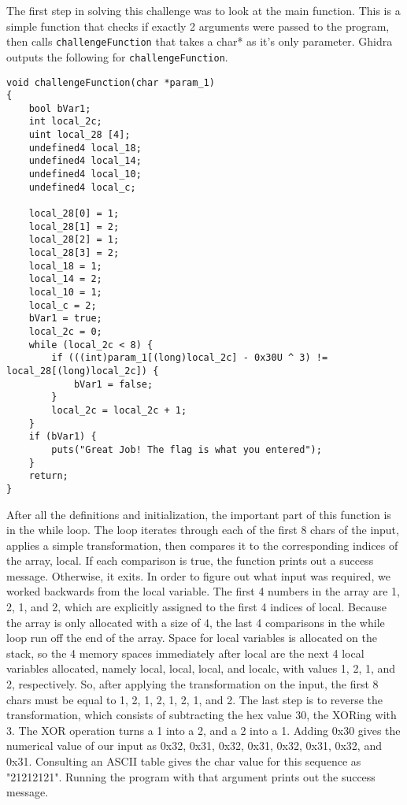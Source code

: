 The first step in solving this challenge was to look at the main function. This is a simple function that checks if exactly 2 arguments were passed to the program, then calls \texttt{challengeFunction} that takes a char* as it's only parameter. Ghidra outputs the following for \texttt{challengeFunction}.

\begin{lstlisting}
void challengeFunction(char *param_1)
{
	bool bVar1;
	int local_2c;
	uint local_28 [4];
	undefined4 local_18;
	undefined4 local_14;
	undefined4 local_10;
	undefined4 local_c;
	
	local_28[0] = 1;
	local_28[1] = 2;
	local_28[2] = 1;
	local_28[3] = 2;
	local_18 = 1;
	local_14 = 2;
	local_10 = 1;
	local_c = 2;
	bVar1 = true;
	local_2c = 0;
	while (local_2c < 8) {
		if (((int)param_1[(long)local_2c] - 0x30U ^ 3) != local_28[(long)local_2c]) {
			bVar1 = false;
		}
		local_2c = local_2c + 1;
	}
	if (bVar1) {
		puts("Great Job! The flag is what you entered");
	}
	return;
}
\end{lstlisting}

After all the definitions and initialization, the important part of this function is in the while loop. The loop iterates through each of the first 8 chars of the input, applies a simple transformation, then compares it to the corresponding indices of the array, local. If each comparison is true, the function prints out a success message. Otherwise, it exits. In order to figure out what input was required, we worked backwards from the local variable. The first 4 numbers in the array are 1, 2, 1, and 2, which are explicitly assigned to the first 4 indices of local. Because the array is only allocated with a size of 4, the last 4 comparisons in the while loop run off the end of the array. Space for local variables is allocated on the stack, so the 4 memory spaces immediately after local are the next 4 local variables allocated, namely local, local, local, and local\textunderscore c, with values 1, 2, 1, and 2, respectively. So, after applying the transformation on the input, the first 8 chars must be equal to 1, 2, 1, 2, 1, 2, 1, and 2. The last step is to reverse the transformation, which consists of subtracting the hex value 30, the XORing with 3. The XOR operation turns a 1 into a 2, and a 2 into a 1. Adding 0x30 gives the numerical value of our input as 0x32, 0x31, 0x32, 0x31, 0x32, 0x31, 0x32, and 0x31. Consulting an ASCII table gives the char value for this sequence as "21212121". Running the program with that argument prints out the success message.

